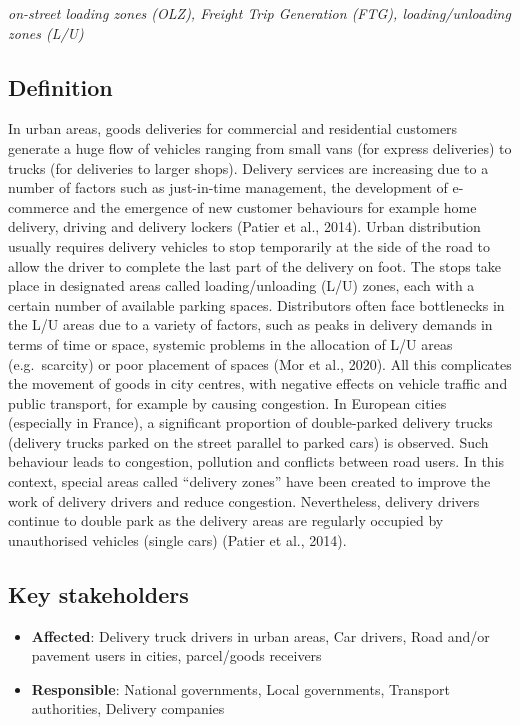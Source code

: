 \documentclass[
]{book}
\providecommand{\tightlist}{%
  \setlength{\itemsep}{0pt}\setlength{\parskip}{0pt}}
\begin{document}
\emph{on-street loading zones (OLZ), Freight Trip Generation (FTG), loading/unloading zones (L/U) }

\hypertarget{definition-24}{%
\subsection*{Definition}\label{definition-24}}

In urban areas, goods deliveries for commercial and residential customers generate a huge flow of vehicles ranging from small vans (for express deliveries) to trucks (for deliveries to larger shops). Delivery services are increasing due to a number of factors such as just-in-time management, the development of e-commerce and the emergence of new customer behaviours for example home delivery, driving and delivery lockers (Patier et al., 2014).
Urban distribution usually requires delivery vehicles to stop temporarily at the side of the road to allow the driver to complete the last part of the delivery on foot. The stops take place in designated areas called loading/unloading (L/U) zones, each with a certain number of available parking spaces. Distributors often face bottlenecks in the L/U areas due to a variety of factors, such as peaks in delivery demands in terms of time or space, systemic problems in the allocation of L/U areas (e.g.~scarcity) or poor placement of spaces (Mor et al., 2020).
All this complicates the movement of goods in city centres, with negative effects on vehicle traffic and public transport, for example by causing congestion. In European cities (especially in France), a significant proportion of double-parked delivery trucks (delivery trucks parked on the street parallel to parked cars) is observed. Such behaviour leads to congestion, pollution and conflicts between road users. In this context, special areas called ``delivery zones'' have been created to improve the work of delivery drivers and reduce congestion. Nevertheless, delivery drivers continue to double park as the delivery areas are regularly occupied by unauthorised vehicles (single cars) (Patier et al., 2014).

\hypertarget{key-stakeholders-24}{%
\subsection*{Key stakeholders}\label{key-stakeholders-24}}

\begin{itemize}
\tightlist
\item
  \textbf{Affected}: Delivery truck drivers in urban areas, Car drivers, Road and/or pavement users in cities, parcel/goods receivers
\item
  \textbf{Responsible}: National governments, Local governments, Transport authorities, Delivery companies
\end{itemize}
\end{document}
